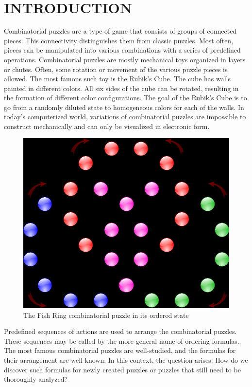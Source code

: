 \documentclass[a4paper,twocolumn,10pt]{article}
\begin{document}
\section{INTRODUCTION}

Combinatorial puzzles are a type of game that consists of groups of connected pieces. This connectivity distinguishes them from classic puzzles. Most often, pieces can be manipulated into various combinations with a series of predefined operations. Combinatorial puzzles are mostly mechanical toys organized in layers or chutes. Often, some rotation or movement of the various puzzle pieces is allowed. The most famous such toy is the Rubik's Cube. The cube has walls painted in different colors. All six sides of the cube can be rotated, resulting in the formation of different color configurations. The goal of the Rubik's Cube is to go from a randomly diluted state to homogeneous colors for each of the walls. In today's computerized world, variations of combinatorial puzzles are impossible to construct mechanically and can only be visualized in electronic form.

\begin{figure}
	\centering
	\includegraphics[width=1.0\linewidth]{figure01.png}
	\caption{The Fish Ring combinatorial puzzle in its ordered state}
	\label{figure01}
\end{figure}

Predefined sequences of actions are used to arrange the combinatorial puzzles. These sequences may be called by the more general name of ordering formulas. The most famous combinatorial puzzles are well-studied, and the formulas for their arrangement are well-known. In this context, the question arises: How do we discover such formulas for newly created puzzles or puzzles that still need to be thoroughly analyzed?
\end{document}
